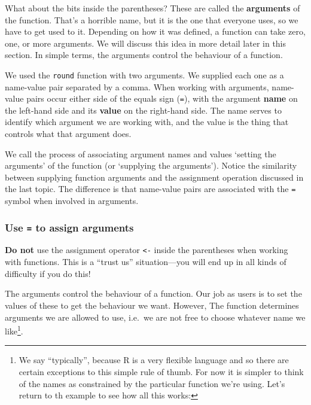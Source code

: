 \documentclass[
]{book}
\newenvironment{greybox}{
  \definecolor{shadecolor}{rgb}{0.95,0.95,0.95}  %
  \color{black}
  \begin{shaded}}
 {\end{shaded}}
\newenvironment{infobox}[1]
  {
  \begin{itemize}
  \renewcommand{\labelitemi}{
    \raisebox{-.7\height}[0pt][0pt]{
      {\setkeys{Gin}{width=3em,keepaspectratio}
        \texttt{[image: images/\#1]}}
    }
  }
  \setlength{\fboxsep}{1em}
  \begin{greybox}
  \item
  }
  {
  \end{greybox}
  \end{itemize}
  }
\begin{document}
What about the bits inside the parentheses? These are called the \textbf{arguments} of the function. That's a horrible name, but it is the one that everyone uses, so we have to get used to it. Depending on how it was defined, a function can take zero, one, or more arguments. We will discuss this idea in more detail later in this section. In simple terms, the arguments control the behaviour of a function.

We used the \texttt{round} function with two arguments. We supplied each one as a name-value pair separated by a comma. When working with arguments, name-value pairs occur either side of the equals sign (\texttt{=}), with the argument \textbf{name} on the left-hand side and its \textbf{value} on the right-hand side. The name serves to identify which argument we are working with, and the value is the thing that controls what that argument does.

We call the process of associating argument names and values `setting the arguments' of the function (or `supplying the arguments'). Notice the similarity between supplying function arguments and the assignment operation discussed in the last topic. The difference is that name-value pairs are associated with the \texttt{=} symbol when involved in arguments.

\begin{infobox}{warning}

\hypertarget{use-to-assign-arguments}{%
\subsubsection*{\texorpdfstring{Use \texttt{=} to assign arguments}{Use = to assign arguments}}\label{use-to-assign-arguments}}

\textbf{Do not} use the assignment operator \texttt{\textless{}-} inside the parentheses when working with functions. This is a ``trust us'' situation---you will end up in all kinds of difficulty if you do this!

\end{infobox}

The arguments control the behaviour of a function. Our job as users is to set the values of these to get the behaviour we want. However, The function determines arguments we are allowed to use, i.e.~we are not free to choose whatever name we like\footnote{We say ``typically'', because R is a very flexible language and so there are certain exceptions to this simple rule of thumb. For now it is simpler to think of the names as constrained by the particular function we're using. Let's return to th example to see how all this works:}.
\end{document}
